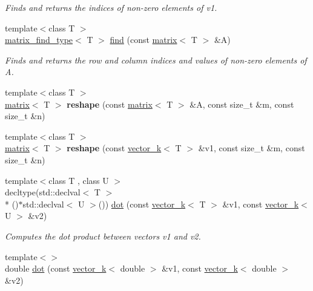 \begin{DoxyCompactItemize}
\begin{DoxyCompactList}\small\item\em Finds and returns the indices of non-\/zero elements of v1. \end{DoxyCompactList}\item 
\hypertarget{namespacekeycpp_a97f0fc27cf8489f3f556fb1a0c975115}{{\footnotesize template$<$class T $>$ }\\\hyperlink{structkeycpp_1_1matrix__find__type}{matrix\-\_\-find\-\_\-type}$<$ T $>$ \hyperlink{namespacekeycpp_a97f0fc27cf8489f3f556fb1a0c975115}{find} (const \hyperlink{classkeycpp_1_1matrix}{matrix}$<$ T $>$ \&A)}\label{namespacekeycpp_a97f0fc27cf8489f3f556fb1a0c975115}

\begin{DoxyCompactList}\small\item\em Finds and returns the row and column indices and values of non-\/zero elements of A. \end{DoxyCompactList}\item 
\hypertarget{namespacekeycpp_a8e6462a878df6e022bd4f9aa6f953983}{{\footnotesize template$<$class T $>$ }\\\hyperlink{classkeycpp_1_1matrix}{matrix}$<$ T $>$ {\bfseries reshape} (const \hyperlink{classkeycpp_1_1matrix}{matrix}$<$ T $>$ \&A, const size\-\_\-t \&m, const size\-\_\-t \&n)}\label{namespacekeycpp_a8e6462a878df6e022bd4f9aa6f953983}

\item 
\hypertarget{namespacekeycpp_a1e3e21956e9f34310b243bc45d68b238}{{\footnotesize template$<$class T $>$ }\\\hyperlink{classkeycpp_1_1matrix}{matrix}$<$ T $>$ {\bfseries reshape} (const \hyperlink{classkeycpp_1_1vector__k}{vector\-\_\-k}$<$ T $>$ \&v1, const size\-\_\-t \&m, const size\-\_\-t \&n)}\label{namespacekeycpp_a1e3e21956e9f34310b243bc45d68b238}

\item 
\hypertarget{namespacekeycpp_a04dabe064e99dd423157829c4b133261}{{\footnotesize template$<$class T , class U $>$ }\\decltype(std\-::declval$<$ T $>$\\*
()$\ast$std\-::declval$<$ U $>$()) \hyperlink{namespacekeycpp_a04dabe064e99dd423157829c4b133261}{dot} (const \hyperlink{classkeycpp_1_1vector__k}{vector\-\_\-k}$<$ T $>$ \&v1, const \hyperlink{classkeycpp_1_1vector__k}{vector\-\_\-k}$<$ U $>$ \&v2)}\label{namespacekeycpp_a04dabe064e99dd423157829c4b133261}

\begin{DoxyCompactList}\small\item\em Computes the dot product between vectors v1 and v2. \end{DoxyCompactList}\item 
\hypertarget{namespacekeycpp_a3b8c1401db056696103c4ad8f1aa48ce}{{\footnotesize template$<$$>$ }\\double \hyperlink{namespacekeycpp_a3b8c1401db056696103c4ad8f1aa48ce}{dot} (const \hyperlink{classkeycpp_1_1vector__k}{vector\-\_\-k}$<$ double $>$ \&v1, const \hyperlink{classkeycpp_1_1vector__k}{vector\-\_\-k}$<$ double $>$ \&v2)}\label{namespacekeycpp_a3b8c1401db056696103c4ad8f1aa48ce}


\end{DoxyCompactItemize}
